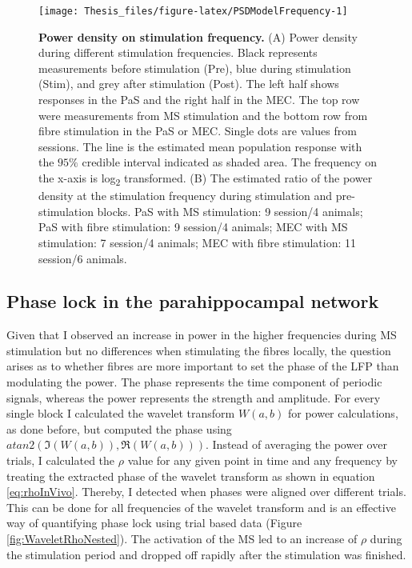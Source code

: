 \documentclass[
  12pt,
  a4paper,
  openany]{book}
\begin{document}
\begin{figure}[htb]

{\centering \texttt{[image: Thesis\_files/figure-latex/PSDModelFrequency-1]} 

}

\caption[Power density dependent on stimulation frequency]{\textbf{Power density on stimulation frequency.} (A) Power density during different stimulation frequencies. Black represents measurements before stimulation (Pre), blue during stimulation (Stim), and grey after stimulation (Post). The left half shows responses in the PaS and the right half in the MEC. The top row were measurements from MS stimulation and the bottom row from fibre stimulation in the PaS or MEC. Single dots are values from sessions. The line is the estimated mean population response with the \(95\%\) credible interval indicated as shaded area. The frequency on the x-axis is log\textsubscript{2} transformed. (B) The estimated ratio of the power density at the stimulation frequency during stimulation and pre-stimulation blocks. PaS with MS stimulation: 9 session/4 animals; PaS with fibre stimulation: 9 session/4 animals; MEC with MS stimulation: 7 session/4 animals; MEC with fibre stimulation: 11 session/6 animals.}\label{fig:PSDModelFrequency}
\end{figure}

\FloatBarrier

\hypertarget{phase-lock-in-the-parahippocampal-network}{%
\subsection{Phase lock in the parahippocampal network}\label{phase-lock-in-the-parahippocampal-network}}

Given that I observed an increase in power in the higher frequencies during MS stimulation but no differences when stimulating the fibres locally, the question arises as to whether fibres are more important to set the phase of the LFP than modulating the power. The phase represents the time component of periodic signals, whereas the power represents the strength and amplitude. For every single block I calculated the wavelet transform \(W(a,b)\) for power calculations, as done before, but computed the phase using \(atan2(\Im(W(a,b)), \Re(W(a,b)))\). Instead of averaging the power over trials, I calculated the \(\rho\) value for any given point in time and any frequency by treating the extracted phase of the wavelet transform as shown in equation \eqref{eq:rhoInVivo}. Thereby, I detected when phases were aligned over different trials. This can be done for all frequencies of the wavelet transform and is an effective way of quantifying phase lock using trial based data (Figure \ref{fig:WaveletRhoNested}). The activation of the MS led to an increase of \(\rho\) during the stimulation period and dropped off rapidly after the stimulation was finished.
\end{document}
